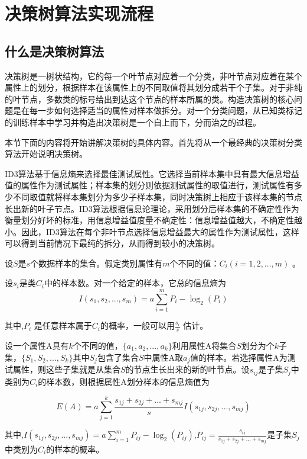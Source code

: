 \section{决策树算法实现流程}
\subsection{什么是决策树算法}
决策树是一树状结构，它的每一个叶节点对应着一个分类，非叶节点对应着在某个属性上的划分，根据样本在该属性上的不同取值将其划分成若干个子集。对于非纯的叶节点，多数类的标号给出到达这个节点的样本所属的类。构造决策树的核心问题是在每一步如何选择适当的属性对样本做拆分。对一个分类问题，从已知类标记的训练样本中学习并构造出决策树是一个自上而下，分而治之的过程。

本节下面的内容将开始讲解决策树的具体内容。首先将从一个最经典的决策树分类算法开始说明决策树。

ID3算法基于信息熵来选择最佳测试属性。它选择当前样本集中具有最大信息增益值的属性作为测试属性；样本集的划分则依据测试属性的取值进行，测试属性有多少不同取值就将样本集划分为多少子样本集，同时决策树上相应于该样本集的节点长出新的叶子节点。ID3算法根据信息论理论，采用划分后样本集的不确定性作为衡量划分好坏的标准，用信息增益值度量不确定性：信息增益值越大，不确定性越小。因此，ID3算法在每个非叶节点选择信息增益最大的属性作为测试属性，这样可以得到当前情况下最纯的拆分，从而得到较小的决策树。

设$S$是$s$个数据样本的集合。假定类别属性有$m$个不同的值：$C_i(i=1,2,...,m)$ 。

设$s_i$是类$C_i$中的样本数。对一个给定的样本，它总的信息熵为
\begin{equation}
I(s_1,s_2,...,s_m)=a\sum_{i=1}^m P_i-\log_2(P_i)
 \end{equation}
                  
其中,$P_i$ 是任意样本属于$C_i$的概率，一般可以用$\frac{s_i}{s}$ 估计。

设一个属性A具有$k$个不同的值，$\{a_1,a_2,...,a_k\}$利用属性A将集合$S$划分为个$k$子集，$\{S_1,S_2,...,S_k\}$其中$S_j$包含了集合$S$中属性A取$a_j$值的样本。若选择属性A为测试属性，则这些子集就是从集合$S$的节点生长出来的新的叶节点。设$s_{ij}$是子集$S_j$中类别为$C_i$的样本数，则根据属性A划分样本的信息熵值为

\begin{equation}
E(A)=a\sum_{j=1}^k\frac{s_{1j}+s_{2j}+...+s_{mj}}{s}I(s_{1j},s_{2j},...,s_{mj})
\end{equation}

其中,$I(s_{1j},s_{2j},...,s_{mj})=a\sum_{i=1}^mP_{ij}-\log_2(P_{ij})$,$P_{ij}=\frac{s_{ij}}{s_{1j}+s_{2j}+...+s_{mj}}$是子集$S_j$中类别为$C_i$的样本的概率。

